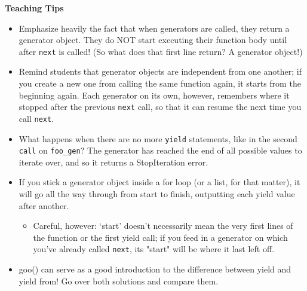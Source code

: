 \begin{blocksection}
\begin{guide}
\textbf{Teaching Tips}
\begin{itemize}
\item Emphasize heavily the fact that when generators are called, they return a generator object. They do NOT start executing their function body until after \texttt{next} is called! (So what does that first line return? A generator object!)
\item Remind students that generator objects are independent from one another; if you create a new one from calling the same function again, it starts from the beginning again. Each generator on its own, however, remembers where it stopped after the previous \texttt{next} call, so that it can resume the next time you call \texttt{next}.
\item What happens when there are no more \texttt{yield} statements, like in the second \texttt{call} on \texttt{foo\_gen}? The generator has reached the end of all possible values to iterate over, and so it returns a StopIteration error.
\item If you stick a generator object inside a for loop (or a list, for that matter), it will go all the way through from start to finish, outputting each yield value after another.
\begin{itemize}
\item Careful, however: `start' doesn't necessarily mean the very first lines of the function or the first yield call; if you feed in a generator on which you've already called \texttt{next}, its "start" will be where it last left off.
\end{itemize}
\item goo() can serve as a good introduction to the difference between yield and yield from! Go over both solutions and compare them.
\end{itemize}
\end{guide}
\end{blocksection}
